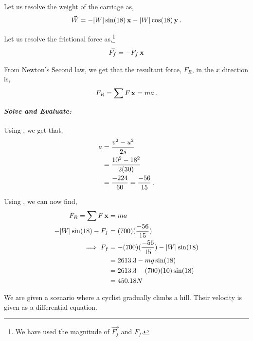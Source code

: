 \begin{subquestions}
Let us resolve the weight of the carriage as,
\begin{equation}
	\vec{W} = -|W|\sin(18)\,\mathbf{x}-|W|\cos(18)\,\mathbf{y} \,.
\end{equation}

Let us resolve the frictional force as,\footnote{We have used the magnitude of $\vec{F_f}$ and $F_f$.}
\begin{equation}
	\vec{F_f} = -F_f \,\mathbf{x}
\end{equation}

From Newton's Second law, we get that the resultant force, $F_R$, in the $x$ direction is,
\begin{equation}
	F_R = \sum F \,\mathbf{x} = ma \,.	\label{2013:q5:Newton1}
\end{equation}




\textbf{\textit{Solve and Evaluate:}} \\ \\
Using , we get that,
\begin{align}
	a & = \frac{v^2-u^2}{2s} \nonumber \\
	  & = \frac{10^2-18^2}{2(30)} \nonumber \\
	  & = \frac{-224}{60} = \frac{-56}{15} \,. 
\end{align}

Using , we can now find,
\begin{align}
	F_R = \sum F \,\mathbf{x} & = ma \nonumber \\
	      -|W|\sin(18) - F_f & = (700)(\frac{-56}{15}) \nonumber \\
	      \implies F_f & = -(700)(\frac{-56}{15})-|W|\sin(18) \nonumber \\
	                   & = 2613.3-mg\sin(18) \nonumber \\
	                   & = 2613.3-(700)(10)\sin(18) \nonumber \\
	                   & = 450.18N
\end{align}



\subquestion
We are given a scenario where a cyclist gradually climbs a hill. Their velocity is given as a differential equation.


\end{subquestions}
